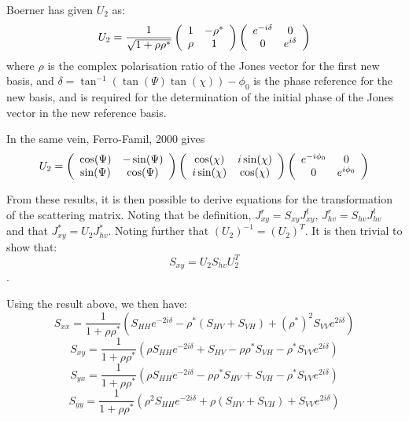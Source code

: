Boerner \cite{Boerner_1991_ProcsIEEE} has given $U_2$ as:
\begin{equation}
U_2 = \frac{1}{\sqrt{1+\rho\rho^*}}
\left(
\begin{array}{c c}
 1 & -\rho^* \\
 \rho & 1
\end{array}
\right)
\left(
\begin{array}{c c}
 e^{-i\delta} & 0 \\
 0 & e^{i\delta}
\end{array}
\right)
\end{equation}
where
	$\rho$ is the complex polarisation ratio of the Jones vector for the first new basis, and
	$\delta = \tan^{-1}(\tan(\Psi) \tan(\chi)) - \phi_0$ is the phase reference for the new basis, 
	and is required for the determination of the initial phase of the Jones vector in the new reference basis.

In the same vein, Ferro-Famil, 2000 gives
\begin{equation}
U_2 = \left(
\begin{array}{c c}
 \cos(\Psi) & -\sin(\Psi) \\
 \sin(\Psi) & \cos(\Psi)
\end{array}
\right)
\left(
\begin{array}{c c}
 \cos(\chi) & i\sin(\chi) \\
 i\sin(\chi) & \cos(\chi)
\end{array}
\right)
\left(
\begin{array}{c c}
 e^{-i \phi_0} & 0 \\
 0 & e^{i \phi_0}
\end{array}
\right)    
\end{equation}

From these results, it is then possible to derive equations for the transformation of the scattering matrix.
Noting that be definition, $J_{xy}^r=S_{xy} J_{xy}^t$, $J_{hv}^r=S_{hv} J_{hv}^t$ 
and that $J_{xy}^*= U_2 J_{hv}^*$. 
Noting further that $(U_2)^{-1} = (U_2)^T$.
It is then trivial to show that:
\begin{equation}
S_{xy} = U_2 S_{hv} U_2^T
\end{equation}.

Using the result above, we then have:
\begin{equation}
S_{xx} = \frac{1}{1+\rho \rho^*} 
\left( 
S_{HH} e^{-2i\delta} - \rho^* (S_{HV}+S_{VH}) + (\rho^*)^2 S_{VV} e^{2i\delta}
\right)
\end{equation}
\begin{equation}
S_{xy} = \frac{1}{1+\rho \rho^*} 
\left( 
\rho S_{HH} e^{-2i\delta} + S_{HV} -\rho \rho^* S_{VH} - \rho^* S_{VV} e^{2i\delta}
\right)
\end{equation}
\begin{equation}
S_{yx} = \frac{1}{1+\rho \rho^*} 
\left( 
\rho S_{HH} e^{-2i\delta} - \rho \rho^* S_{HV} + S_{VH} - \rho^* S_{VV} e^{2i\delta}
\right)
\end{equation}
\begin{equation}
S_{yy} = \frac{1}{1+\rho \rho^*} 
\left( 
\rho^2 S_{HH} e^{-2i\delta} + \rho (S_{HV} + S_{VH}) + S_{VV} e^{2i\delta}
\right)
\end{equation}

